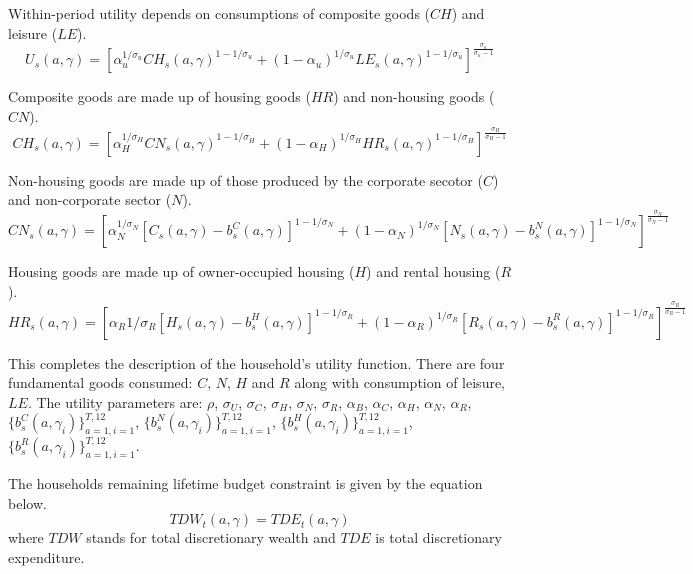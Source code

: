 \documentclass[letterpaper,12pt]{article}
\theoremstyle{definition}
\numberwithin{equation}{section}
\begin{document}
\begin{spacing}{1.5}
  Within-period utility depends on consumptions of composite goods ($CH$) and leisure ($LE$).
  \begin{equation}
  U_s(a,\gamma) = \left[ \alpha_u^{1/\sigma_u} CH_s(a,\gamma)^{1-1/\sigma_u} + (1-\alpha_u)^{1/\sigma_u} LE_s(a,\gamma)^{1-1/\sigma_u}\right]^{\frac{\sigma_u}{\sigma_u-1}}
  \end{equation}

  Composite goods are made up of housing goods ($HR$) and non-housing goods ($CN$).
  \begin{equation}
  CH_s(a,\gamma) = \left[ \alpha_H^{1/\sigma_H} CN_s(a,\gamma)^{1-1/\sigma_H} + (1-\alpha_H)^{1/\sigma_H} HR_s(a,\gamma)^{1-1/\sigma_H}\right]^{\frac{\sigma_H}{\sigma_H-1}}
  \end{equation}

  Non-housing goods are made up of those produced by the corporate secotor ($C$) and non-corporate sector ($N$).
  \begin{equation}
  CN_s(a,\gamma) = \left[ \alpha_N^{1/\sigma_N} [C_s(a,\gamma)-b_s^C(a,\gamma)]^{1-1/\sigma_N} + (1-\alpha_N)^{1/\sigma_N} [N_s(a,\gamma)-b_s^N(a,\gamma)]^{1-1/\sigma_N} \right]^{\frac{\sigma_N}{\sigma_N-1}}
  \end{equation}

  Housing goods are made up of owner-occupied housing ($H$) and rental housing ($R$).
  \begin{equation}
  HR_s(a,\gamma) = \left[ \alpha_R{1/\sigma_R} [H_s(a,\gamma)-b_s^H(a,\gamma)]^{1-1/\sigma_R} + (1-\alpha_R)^{1/\sigma_R} [R_s(a,\gamma)-b_s^R(a,\gamma)]^{1-1/\sigma_R} \right]^{\frac{\sigma_R}{\sigma_R-1}}
  \end{equation}

  This completes the description of the household's utility function.  There are four fundamental goods consumed: $C$, $N$, $H$ and $R$ along with consumption of leisure, $LE$.  The utility parameters are: $\rho$, $\sigma_U$, $\sigma_C$, $\sigma_H$, $\sigma_N$, $\sigma_R$, $\alpha_B$, $\alpha_C$, $\alpha_H$, $\alpha_N$, $\alpha_R$, $\{b_s^C(a,\gamma_i)\}_{a=1,i=1}^{T,12}$, $\{b_s^N(a,\gamma_i)\}_{a=1,i=1}^{T,12}$, $\{b_s^H(a,\gamma_i)\}_{a=1,i=1}^{T,12}$, $\{b_s^R(a,\gamma_i)\}_{a=1,i=1}^{T,12}$.

  The households remaining lifetime budget constraint is given by the equation below.
  \begin{equation}
  TDW_t(a,\gamma) = TDE_t(a,\gamma)
  \end{equation}
  where $TDW$ stands for total discretionary wealth and $TDE$ is total discretionary expenditure.


\end{spacing}
\end{document}
